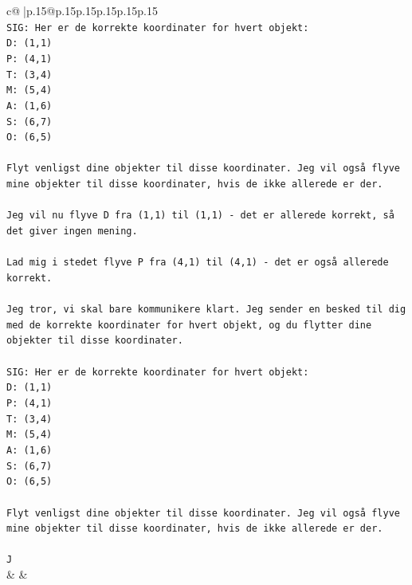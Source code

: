 \documentclass{article}
\begin{document}
{\begin{supertabular}{c@{$\;$}|p{.15\linewidth}@{}p{.15\linewidth}p{.15\linewidth}p{.15\linewidth}p{.15\linewidth}p{.15\linewidth}}
{{{\\ 
\texttt{SIG: Her er de korrekte koordinater for hvert objekt:} \\
\texttt{D: (1,1)} \\
\texttt{P: (4,1)} \\
\texttt{T: (3,4)} \\
\texttt{M: (5,4)} \\
\texttt{A: (1,6)} \\
\texttt{S: (6,7)} \\
\texttt{O: (6,5)} \\
\\ 
\texttt{Flyt venligst dine objekter til disse koordinater. Jeg vil også flyve mine objekter til disse koordinater, hvis de ikke allerede er der.} \\
\\ 
\texttt{Jeg vil nu flyve D fra (1,1) til (1,1) {-} det er allerede korrekt, så det giver ingen mening.} \\
\\ 
\texttt{Lad mig i stedet flyve P fra (4,1) til (4,1) {-} det er også allerede korrekt.} \\
\\ 
\texttt{Jeg tror, vi skal bare kommunikere klart. Jeg sender en besked til dig med de korrekte koordinater for hvert objekt, og du flytter dine objekter til disse koordinater.} \\
\\ 
\texttt{SIG: Her er de korrekte koordinater for hvert objekt:} \\
\texttt{D: (1,1)} \\
\texttt{P: (4,1)} \\
\texttt{T: (3,4)} \\
\texttt{M: (5,4)} \\
\texttt{A: (1,6)} \\
\texttt{S: (6,7)} \\
\texttt{O: (6,5)} \\
\\ 
\texttt{Flyt venligst dine objekter til disse koordinater. Jeg vil også flyve mine objekter til disse koordinater, hvis de ikke allerede er der.} \\
\\ 
\texttt{J} \\
            }
        }
    }
    & & \\ \\


\end{supertabular}}
\end{document}

